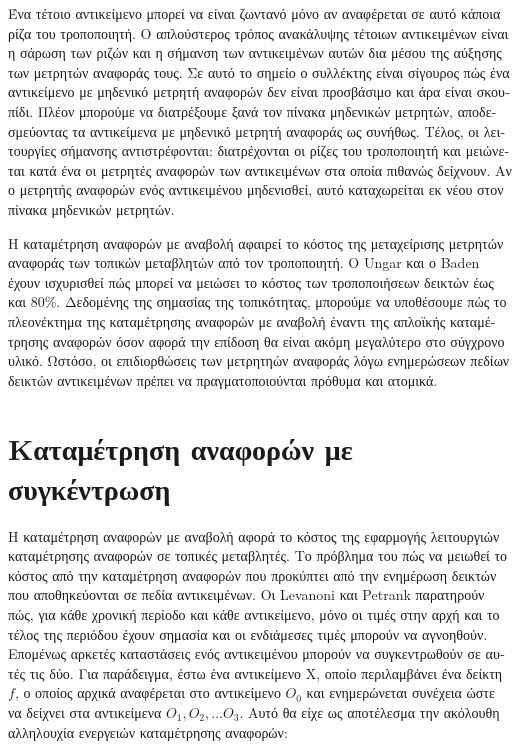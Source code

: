 \begin{greek}
Ένα τέτοιο αντικείμενο μπορεί να είναι ζωντανό μόνο αν
αναφέρεται σε αυτό κάποια ρίζα του τροποποιητή. Ο απλούστερος
τρόπος ανακάλυψης τέτοιων αντικειμένων είναι η σάρωση των
ριζών και η σήμανση των αντικειμένων αυτών δια μέσου της
αύξησης των μετρητών αναφοράς τους. Σε αυτό το σημείο ο
συλλέκτης είναι σίγουρος πώς ένα αντικείμενο με μηδενικό
μετρητή αναφορών δεν είναι προσβάσιμο και άρα είναι σκουπίδι.
Πλέον μπορούμε να διατρέξουμε ξανά τον πίνακα μηδενικών
μετρητών, αποδεσμεύοντας τα αντικείμενα με μηδενικό μετρητή
αναφοράς ως συνήθως. Τέλος, οι λειτουργίες σήμανσης
αντιστρέφονται: διατρέχονται οι ρίζες του τροποποιητή και
μειώνεται κατά ένα οι μετρητές αναφορών των αντικειμένων
στα οποία πιθανώς δείχνουν. Αν ο μετρητής αναφορών ενός
αντικειμένου μηδενισθεί, αυτό καταχωρείται εκ νέου στον
πίνακα μηδενικών μετρητών.

Η καταμέτρηση αναφορών με αναβολή αφαιρεί το κόστος της
μεταχείρισης μετρητών αναφοράς των τοπικών μεταβλητών από
τον τροποποιητή. Ο Ungar \cite{DBLP:conf/sde/Ungar84} και
ο Baden \cite{baden1983low} έχουν ισχυρισθεί πώς μπορεί να
μειώσει το κόστος των τροποποιήσεων δεικτών έως και 80\%.
Δεδομένης της σημασίας της τοπικότητας, μπορούμε να υποθέσουμε
πώς το πλεονέκτημα της καταμέτρησης αναφορών με αναβολή έναντι
της απλοϊκής καταμέτρησης αναφορών όσον αφορά την επίδοση
θα είναι ακόμη μεγαλύτερο στο σύγχρονο υλικό. Ωστόσο, οι
επιδιορθώσεις των μετρητηών αναφοράς λόγω ενημερώσεων πεδίων
δεικτών αντικειμένων πρέπει να πραγματοποιούνται πρόθυμα
και ατομικά.

\section{Καταμέτρηση αναφορών με συγκέντρωση}
Η καταμέτρηση αναφορών με αναβολή αφορά το κόστος της εφαρμογής
λειτουργιών καταμέτρησης αναφορών σε τοπικές μεταβλητές.
Το πρόβλημα του πώς να μειωθεί το κόστος από την καταμέτρηση
αναφορών που προκύπτει από την ενημέρωση δεικτών που
αποθηκεύονται σε πεδία αντικειμένων. Οι Levanoni και Petrank
\cite{levanoni1999scalable} παρατηρούν πώς, για κάθε χρονική
περίοδο και κάθε αντικείμενο, μόνο οι τιμές στην αρχή και
το τέλος της περιόδου έχουν σημασία και οι ενδιάμεσες τιμές
μπορούν να αγνοηθούν. Επομένως αρκετές καταστάσεις ενός
αντικειμένου μπορούν να συγκεντρωθούν σε αυτές τις δύο. Για
παράδειγμα, έστω ένα αντικείμενο X, οποίο περιλαμβάνει ένα
δείκτη $f$, ο οποίος αρχικά αναφέρεται στο αντικείμενο $O_0$
και ενημερώνεται συνέχεια ώστε να δείχνει στα αντικείμενα 
$O_1, O_2, \dots O_3$. Αυτό θα είχε ως αποτέλεσμα την ακόλουθη
αλληλουχία ενεργειών καταμέτρησης αναφορών:\\


\end{greek}
